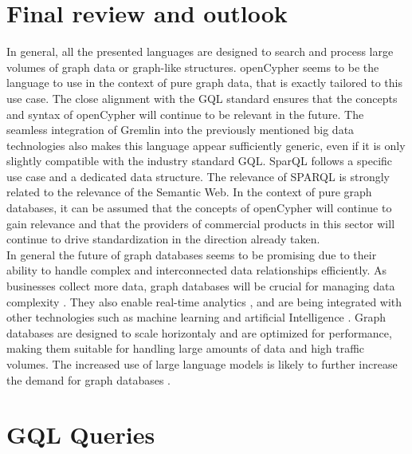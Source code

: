 \section{Final review and outlook}
\label{sec:conclusion:review_and_outlook}
In general, all the presented languages are designed to search and process large volumes 
of graph data or graph-like structures.
openCypher seems to be the language to use in the context of pure graph data, 
that is exactly tailored to this use case.
The close alignment with the GQL standard ensures that the concepts and syntax of openCypher 
will continue to be relevant in the future.
The seamless integration of Gremlin into the previously mentioned big data technologies 
also makes this language appear sufficiently generic, even if it is only slightly compatible with the 
industry standard GQL. 
SparQL follows a specific use case and a dedicated data structure. 
The relevance of SPARQL is strongly related to the relevance of the Semantic Web.
In the context of pure graph databases, it can be assumed that the concepts of openCypher 
will continue to gain 
relevance and that the providers of commercial products in this sector 
will continue to drive standardization in the direction already taken.\\
In general the future of graph databases seems to be promising 
due to their ability to handle complex 
and interconnected data relationships efficiently. 
As businesses collect more data, graph databases will be crucial 
for managing data complexity \citep{BARCELO2017164}. 
They also enable real-time analytics \citep{SHIN202292}, 
and are being integrated with other technologies such as machine learning and 
artificial Intelligence \citep{PATIL2024102683}.
Graph databases are designed to scale horizontaly \citep{SUN2024223}
and are optimized for performance, making them suitable 
for handling large amounts of data and high traffic volumes. 
The increased use of large language models is likely 
to further increase the demand for graph databases \citep{KUMAR2024100308}.

\newpage

\appendix
\setcounter{page}{1}


\section{GQL Queries}

